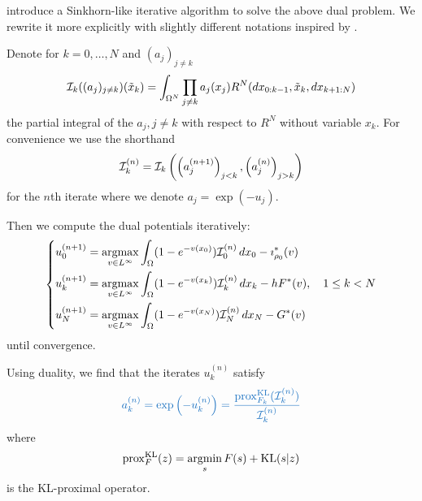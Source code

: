 \documentclass[../report.tex]{subfiles}
\begin{document}
\textcite{benamou2018entropy} introduce a Sinkhorn-like iterative algorithm to solve the above dual problem. We rewrite it more explicitly with slightly different notations inspired by \cite{chizat2016scaling}.

\begin{thmalgo}\label{algo:Algo1}
	Denote for $k=0,\ldots,N$ and $(a_j)_{j\neq k}$
	\[
	\mathcal{I}_k((a_j)_{j\neq k})(\tilde{x}_k) = 
	\int_{\Omega^N}
	\prod_{j\neq k} a_j(x_j)
	R^N(dx_{0:k-1}, \tilde{x}_k, dx_{k+1:N})
	\]
	the partial integral of the $a_j,j\neq k$ with respect to $R^N$ without variable $x_k$.
	For convenience we use the shorthand
	\[
	\mathcal{I}_k^{(n)} = \mathcal{I}_k\left(\left(a^{(n+1)}_j\right)_{j<k},
	\left(a^{(n)}_j\right)_{j>k}\right)
	\]
	for the $n$th iterate where we denote $a_j = \exp(-u_j)$.
	
	Then we compute the dual potentials iteratively:
	\begin{equation}
	\begin{dcases}
	u_0^{(n+1)} = \operatorname*{argmax}_{v \in L^\infty} \int_{\Omega} (1 - e^{-v(x_0)}) \mathcal{I}_0^{(n)} \,dx_0 - \imath_{\rho_0}^*(v) \\
	u_k^{(n+1)} = \operatorname*{argmax}_{v \in L^\infty} \int_{\Omega} (1- e^{-v(x_k)}) \mathcal{I}_k^{(n)} \,dx_k - hF^*(v) ,
	\quad 1\leq k < N  \\
	u_N^{(n+1)} = \operatorname*{argmax}_{v \in L^\infty} \int_{\Omega} (1 - e^{-v(x_N)}) \mathcal{I}_N^{(n)} \,dx_N - G^*(v)
	\end{dcases}
	\end{equation}
	until convergence.
	
	Using duality, we find that the iterates $u_k^{(n)}$ satisfy
	\begin{equation}
	{\bluefont
	a_k^{(n)} = \exp\left(-u^{(n)}_k\right) =
	\frac{
		\prox_{F_k}^{\KL}(\calI_k^{(n)})
	}{\calI_k^{(n)}}}
	\end{equation}
	where
	\[
		\operatorname{prox}_F^{\operatorname{KL}}(z) = \operatorname*{argmin}_{s} F(s) + \operatorname{KL}(s|z)
	\]
	is the KL-proximal operator.
\end{thmalgo}
\end{document}
